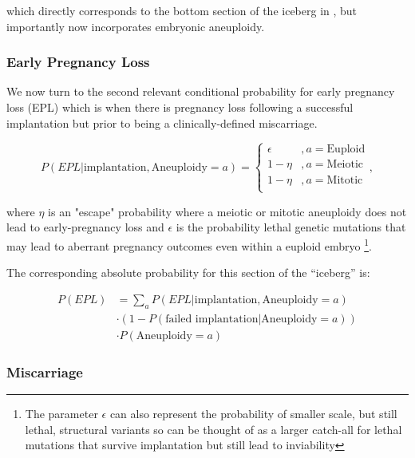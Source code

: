 \documentclass{article}
\begin{document}
which directly corresponds to the bottom section of the iceberg in \citep{Macklon2002-zn}, but importantly now incorporates embryonic aneuploidy. 


\subsubsection*{Early Pregnancy Loss}

We now turn to the second relevant conditional probability for early pregnancy loss (EPL) which is when there is pregnancy loss following a successful implantation but prior to being a clinically-defined miscarriage. 

\begin{equation}
	P(EPL | \text{implantation}, \text{Aneuploidy}=a) = \begin{cases}
	\epsilon &, a= \text{Euploid}\\
	1 - \eta &, a = \text{Meiotic}\\
	1 - \eta &, a = \text{Mitotic}\\
	\end{cases},
\end{equation}

where $\eta$ is an "escape" probability where a meiotic or mitotic aneuploidy does not lead to early-pregnancy loss and $\epsilon$ is the probability lethal genetic mutations that may lead to aberrant pregnancy outcomes even within a euploid embryo \footnote{The parameter $\epsilon$ can also represent the probability of smaller scale, but still lethal, structural variants so can be thought of as a larger catch-all for lethal mutations that survive implantation but still lead to inviability}. 

The corresponding absolute probability for this section of the ``iceberg'' is: 

\begin{equation}
\begin{aligned}
P(EPL) &= \sum_{a} P(EPL | \text{implantation}, \text{Aneuploidy}=a) \\
&\cdot (1 - P(\text{failed implantation} | \text{Aneuploidy} = a))\\ 
&\cdot P(\text{Aneuploidy} = a)
\end{aligned}
\end{equation}

\subsubsection*{Miscarriage}
\end{document}
